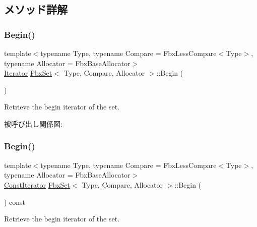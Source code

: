 \subsection{メソッド詳解}
\mbox{\label{class_fbx_set_a77e36a10cf4707bce192e1b6fb8dd404}} 
\subsubsection{\texorpdfstring{Begin()}{Begin()}\hspace{0.1cm}{\footnotesize\ttfamily [1/2]}}
{\footnotesize\ttfamily template$<$typename Type, typename Compare = Fbx\+Less\+Compare$<$\+Type$>$, typename Allocator = Fbx\+Base\+Allocator$>$ \\
\hyperlink{class_fbx_set_ad1b543e0f63f04f4d2dc8e9e3da9bcaa}{Iterator} \hyperlink{class_fbx_set}{Fbx\+Set}$<$ Type, Compare, Allocator $>$\+::Begin (\begin{DoxyParamCaption}{ }\end{DoxyParamCaption})}



Retrieve the begin iterator of the set. 

被呼び出し関係図\+:
\mbox{\label{class_fbx_set_a1435632a44bad20741d19be792f0b6c0}} 
\subsubsection{\texorpdfstring{Begin()}{Begin()}\hspace{0.1cm}{\footnotesize\ttfamily [2/2]}}
{\footnotesize\ttfamily template$<$typename Type, typename Compare = Fbx\+Less\+Compare$<$\+Type$>$, typename Allocator = Fbx\+Base\+Allocator$>$ \\
\hyperlink{class_fbx_set_af9aee2f7b6a6638b816ea95bd510928c}{Const\+Iterator} \hyperlink{class_fbx_set}{Fbx\+Set}$<$ Type, Compare, Allocator $>$\+::Begin (\begin{DoxyParamCaption}{ }\end{DoxyParamCaption}) const}



Retrieve the begin iterator of the set. 

\mbox{\label{class_fbx_set_afc01fe172f741a42492831b57d44ed8f}} 
